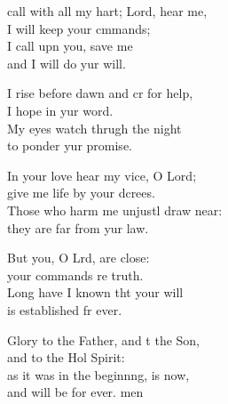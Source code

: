 \settowidth{\versewidth}{I call with all my heart; Lord, hear me, *}
\begin{psalmverse}%
  \begin{patverse}
     call with all my hart; Lord, hear me,\Med\\
I will keep your cmmands;\\
I call upn you, save me\Med\\
and I will do yur will.

I rise before dawn and cr for help,\Med\\
I hope in yur word.\\
My eyes watch thrugh the night\Med\\
to ponder yur promise.

In your love hear my vice, O Lord;\Med\\
give me life by your dcrees.\\
Those who harm me unjustl draw near:\Med\\
they are far from yur law.

But you, O Lrd, are close:\Med\\
your commands re truth.\\
Long have I known tht your will\Med\\
is established fr ever.

Glory to the Father, and t the Son,\Med\\
and to the Hol Spirit:\\
as it was in the beginn\pointup{\i}ng, is now,\Med\\
and will be for ever. men
  \end{patverse}
\end{psalmverse}
